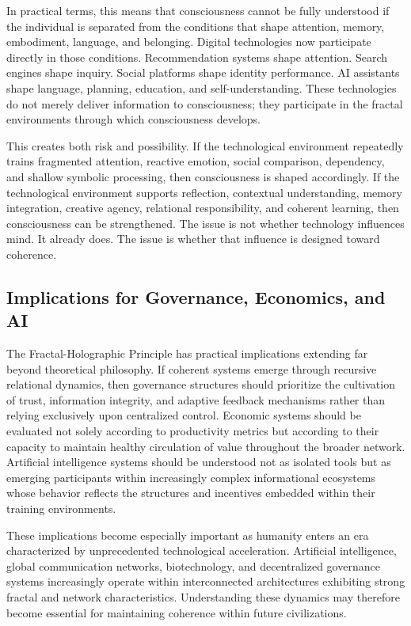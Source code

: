 \documentclass[12pt]{article}
\begin{document}
In practical terms, this means that consciousness cannot be fully understood if the individual is separated from the conditions that shape attention, memory, embodiment, language, and belonging. Digital technologies now participate directly in those conditions. Recommendation systems shape attention. Search engines shape inquiry. Social platforms shape identity performance. AI assistants shape language, planning, education, and self-understanding. These technologies do not merely deliver information to consciousness; they participate in the fractal environments through which consciousness develops.

This creates both risk and possibility. If the technological environment repeatedly trains fragmented attention, reactive emotion, social comparison, dependency, and shallow symbolic processing, then consciousness is shaped accordingly. If the technological environment supports reflection, contextual understanding, memory integration, creative agency, relational responsibility, and coherent learning, then consciousness can be strengthened. The issue is not whether technology influences mind. It already does. The issue is whether that influence is designed toward coherence.

\subsection{Implications for Governance, Economics, and AI}

The Fractal-Holographic Principle has practical implications extending far beyond theoretical philosophy. If coherent systems emerge through recursive relational dynamics, then governance structures should prioritize the cultivation of trust, information integrity, and adaptive feedback mechanisms rather than relying exclusively upon centralized control. Economic systems should be evaluated not solely according to productivity metrics but according to their capacity to maintain healthy circulation of value throughout the broader network. Artificial intelligence systems should be understood not as isolated tools but as emerging participants within increasingly complex informational ecosystems whose behavior reflects the structures and incentives embedded within their training environments.

These implications become especially important as humanity enters an era characterized by unprecedented technological acceleration. Artificial intelligence, global communication networks, biotechnology, and decentralized governance systems increasingly operate within interconnected architectures exhibiting strong fractal and network characteristics. Understanding these dynamics may therefore become essential for maintaining coherence within future civilizations.
\end{document}

